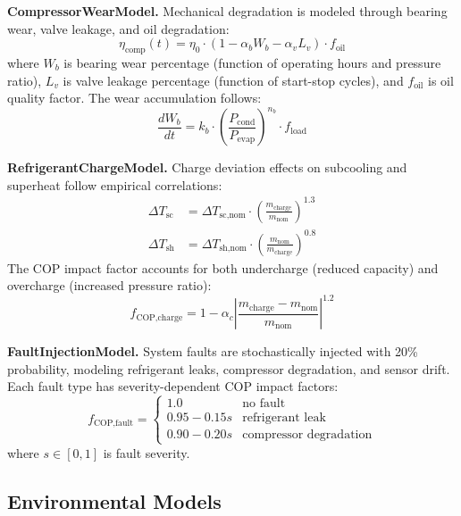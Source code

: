 \documentclass[11pt]{article}
\begin{document}
\textbf{CompressorWearModel.} Mechanical degradation is modeled through bearing wear, valve leakage, and oil degradation:
\begin{equation}
\eta_{\text{comp}}(t) = \eta_0 \cdot (1 - \alpha_b W_b - \alpha_v L_v) \cdot f_{\text{oil}}
\end{equation}
where $W_b$ is bearing wear percentage (function of operating hours and pressure ratio), $L_v$ is valve leakage percentage (function of start-stop cycles), and $f_{\text{oil}}$ is oil quality factor. The wear accumulation follows:
\begin{equation}
\frac{dW_b}{dt} = k_b \cdot \left(\frac{P_{\text{cond}}}{P_{\text{evap}}}\right)^{n_b} \cdot f_{\text{load}}
\end{equation}

\textbf{RefrigerantChargeModel.} Charge deviation effects on subcooling and superheat follow empirical correlations:
\begin{align}
\Delta T_{\text{sc}} &= \Delta T_{\text{sc,nom}} \cdot \left(\frac{m_{\text{charge}}}{m_{\text{nom}}}\right)^{1.3} \\
\Delta T_{\text{sh}} &= \Delta T_{\text{sh,nom}} \cdot \left(\frac{m_{\text{nom}}}{m_{\text{charge}}}\right)^{0.8}
\end{align}
The COP impact factor accounts for both undercharge (reduced capacity) and overcharge (increased pressure ratio):
\begin{equation}
f_{\text{COP,charge}} = 1 - \alpha_c \left| \frac{m_{\text{charge}} - m_{\text{nom}}}{m_{\text{nom}}} \right|^{1.2}
\end{equation}

\textbf{FaultInjectionModel.} System faults are stochastically injected with 20\% probability, modeling refrigerant leaks, compressor degradation, and sensor drift. Each fault type has severity-dependent COP impact factors:
\begin{equation}
f_{\text{COP,fault}} = \begin{cases} 1.0 & \text{no fault} \\ 0.95 - 0.15s & \text{refrigerant leak} \\ 0.90 - 0.20s & \text{compressor degradation} \end{cases}
\end{equation}
where $s \in [0, 1]$ is fault severity.

\subsection{Environmental Models}
\end{document}
